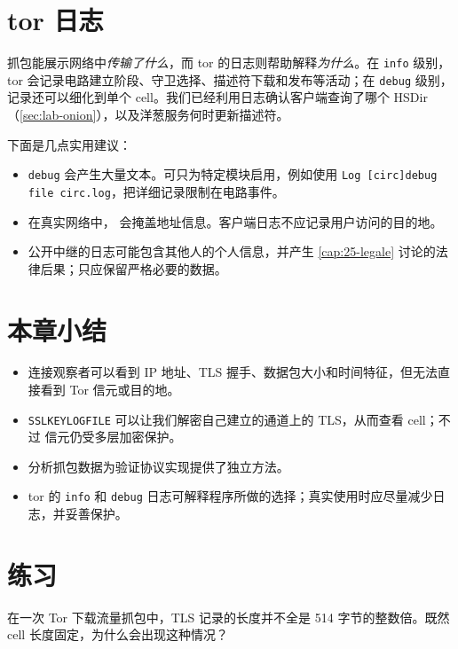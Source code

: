 \section{tor 日志}\label{sec:traffico-log}

抓包能展示网络中\emph{传输了什么}，而 tor 的日志则帮助解释\emph{为什么}。在 \texttt{info} 级别，tor 会记录电路建立阶段、守卫选择、描述符下载和发布等活动；在 \texttt{debug} 级别，记录还可以细化到单个 cell。我们已经利用日志确认客户端查询了哪个 HSDir（\cref{sec:lab-onion}），以及洋葱服务何时更新描述符。

下面是几点实用建议：
\begin{itemize}
  \item \texttt{debug} 会产生大量文本。可只为特定模块启用，例如使用 \texttt{Log [circ]debug file circ.log}，把详细记录限制在电路事件。
  \item 在真实网络中， 会掩盖地址信息。客户端日志不应记录用户访问的目的地。
  \item 公开中继的日志可能包含其他人的个人信息，并产生 \cref{cap:25-legale} 讨论的法律后果；只应保留严格必要的数据。
\end{itemize}

\section*{本章小结}
\begin{itemize}
  \item 连接观察者可以看到 IP 地址、TLS 握手、数据包大小和时间特征，但无法直接看到 Tor 信元或目的地。
  \item \texttt{SSLKEYLOGFILE} 可以让我们解密自己建立的通道上的 TLS，从而查看 cell；不过  信元仍受多层加密保护。
  \item 分析抓包数据为验证协议实现提供了独立方法。
  \item tor 的 \texttt{info} 和 \texttt{debug} 日志可解释程序所做的选择；真实使用时应尽量减少日志，并妥善保护。
\end{itemize}

\section*{练习}

\begin{esercizio}[1]\label{es:20-dimensioni}
在一次 Tor 下载流量抓包中，TLS 记录的长度并不全是 514 字节的整数倍。既然 cell 长度固定，为什么会出现这种情况？
\end{esercizio}

